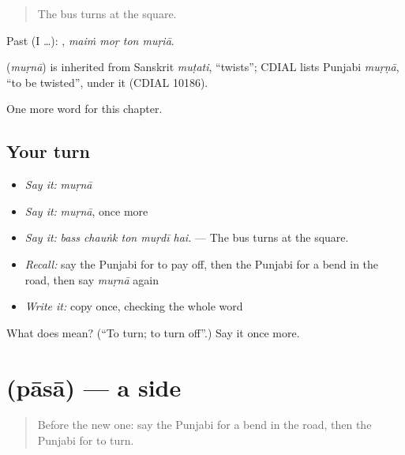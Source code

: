 \begin{quote}
The bus turns at the square.
\end{quote}

Past (I …):    , \emph{maiṁ moṛ ton muṛiā}.

\begin{cousinweb}
\textbf{} (\emph{muṛnā}) is inherited from Sanskrit \emph{muṭati}, \textquotedblleft{}twists\textquotedblright{}; CDIAL lists Punjabi \emph{muṛṇā}, \textquotedblleft{}to be twisted\textquotedblright{}, under it (CDIAL 10186).
\end{cousinweb}

\begin{grammarlens}[title={What you've built}]
One more word for this chapter.
\end{grammarlens}

\subsection*{Your turn}
\begin{itemize}
\raggedright
  \item \emph{Say it:} \emph{muṛnā}
  \item \emph{Say it:} \emph{muṛnā}, once more
  \item \emph{Say it:} \emph{bass chauṅk ton muṛdī hai.} — The bus turns at the square.
  \item \emph{Recall:} say the Punjabi for to pay off, then the Punjabi for a bend in the road, then say \emph{muṛnā} again
  \item \emph{Write it:} copy \textbf{} once, checking the whole word
\end{itemize}

\begin{tcolorbox}[breakable,colback=teal!4,colframe=teal!35!black,title={Before you move on}]
What does  mean? (\textquotedblleft{}To turn; to turn off\textquotedblright{}.) Say it once more.
\end{tcolorbox}
\section[\texorpdfstring{\pa{ਪਾਸਾ} (pāsā)}{ਪਾਸਾ (pāsā)}]{ (pāsā) — a side}

\label{lesson:PA-C263-pasa}



\begin{quote}
Before the new one: say the Punjabi for a bend in the road, then the Punjabi for to turn.
\end{quote}

